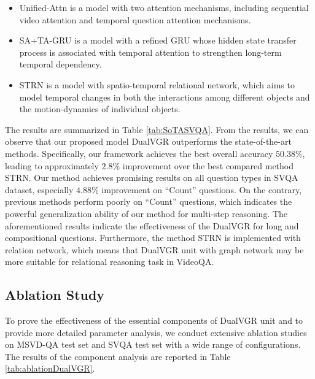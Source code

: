 \documentclass[journal]{IEEEtran}
\begin{document}
\begin{itemize}
    \item Unified-Attn \cite{xue2017unifying} is a model with two attention mechanisms, including sequential video attention and temporal question attention mechanisms. 
    \item SA+TA-GRU \cite{song2018explore} is a model with a refined GRU whose hidden state transfer process is associated with temporal attention to strengthen long-term temporal dependency.
    \item STRN \cite{singh2019spatio} is a model with spatio-temporal relational network, which aims to model temporal changes in both the interactions among different objects and the motion-dynamics of individual objects.
\end{itemize}

The results are summarized in Table \ref{tab:SoTASVQA}. From the results, we can observe that our proposed model DualVGR outperforms the state-of-the-art methods. Specifically, our framework achieves the best overall accuracy $50.38\%$, leading to approximately $2.8\%$ improvement over the best compared method STRN. Our method achieves promising results on all question types in SVQA dataset, especially $4.88\%$ improvement on ``Count'' questions. On the contrary, previous methods perform poorly on ``Count'' questions, which indicates the powerful generalization ability of our method for multi-step reasoning. The aforementioned results indicate the effectiveness of the DualVGR for long and compositional questions. Furthermore, the method STRN is implemented with relation network, which means that DualVGR unit with graph network may be more suitable for relational reasoning task in VideoQA. 
\subsection{Ablation Study}
To prove the effectiveness of the essential components of DualVGR unit and to provide more detailed parameter analysis, we conduct extensive ablation studies on MSVD-QA test set and SVQA test set with a wide range of configurations. The results of the component analysis are reported in Table \ref{tab:ablationDualVGR}.
\end{document}
